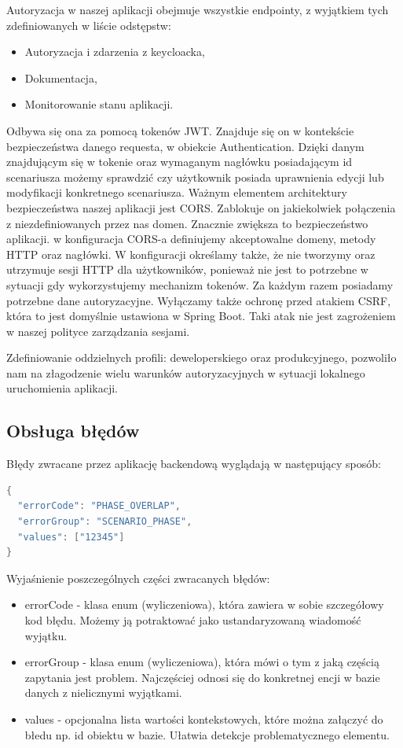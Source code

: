 Autoryzacja w naszej aplikacji obejmuje wszystkie endpointy, z wyjątkiem tych zdefiniowanych w liście odstępstw:
\begin{itemize}
    \item Autoryzacja i zdarzenia z keycloacka,
    \item Dokumentacja,
    \item Monitorowanie stanu aplikacji.
\end{itemize}
Odbywa się ona za pomocą tokenów JWT. Znajduje się on w kontekście bezpieczeństwa danego requesta, w obiekcie Authentication.
Dzięki danym znajdującym się w tokenie oraz wymaganym nagłówku posiadającym id scenariusza możemy sprawdzić czy użytkownik posiada uprawnienia edycji 
lub modyfikacji konkretnego scenariusza. Ważnym elementem architektury bezpieczeństwa naszej aplikacji jest CORS. 
Zablokuje on jakiekolwiek połączenia z niezdefiniowanych przez nas domen. Znacznie zwiększa to bezpieczeństwo aplikacji. 
w konfiguracja CORS-a definiujemy akceptowalne domeny, metody HTTP oraz nagłówki. W konfiguracji określamy także, że 
nie tworzymy oraz utrzymuje sesji HTTP dla użytkowników, ponieważ nie jest to potrzebne w sytuacji gdy wykorzystujemy mechanizm
tokenów. Za każdym razem posiadamy potrzebne dane autoryzacyjne. Wyłączamy także ochronę przed atakiem CSRF, która to jest domyślnie 
ustawiona w Spring Boot. Taki atak nie jest zagrożeniem w naszej polityce zarządzania sesjami.

Zdefiniowanie oddzielnych profili: deweloperskiego oraz produkcyjnego, pozwoliło nam na złagodzenie wielu warunków autoryzacyjnych
w sytuacji lokalnego uruchomienia aplikacji. 

\subsection{Obsługa błędów}

Błędy zwracane przez aplikację backendową wyglądają w następujący sposób:

\begin{lstlisting}[language=Java]
{
  "errorCode": "PHASE_OVERLAP",
  "errorGroup": "SCENARIO_PHASE",
  "values": ["12345"]
}
\end{lstlisting}

Wyjaśnienie poszczególnych części zwracanych błędów:
\begin{itemize}
    \item errorCode - klasa enum (wyliczeniowa), która zawiera w sobie szczegółowy kod błędu. Możemy ją potraktować jako
    ustandaryzowaną wiadomość wyjątku.
    \item errorGroup - klasa enum (wyliczeniowa), która mówi o tym z jaką częścią zapytania jest problem. Najczęściej odnosi się
    do konkretnej encji w bazie danych z nielicznymi wyjątkami.
    \item values - opcjonalna lista wartości kontekstowych, które można załączyć do błedu np. id obiektu w bazie. Ułatwia detekcje 
    problematycznego elementu.
\end{itemize}

